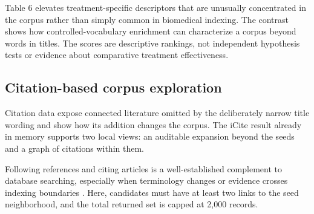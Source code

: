 \begin{table}
\centering
\caption{\label{tab:mesh-keyness-table}MeSH descriptors ranked highest by standardized log odds against the PubMed-wide baseline.}
\centering
{}
\end{table}

Table 6 elevates treatment-specific descriptors that are unusually concentrated
in the corpus rather than simply common in biomedical indexing. The contrast
shows how controlled-vocabulary enrichment can characterize a corpus beyond
words in titles. The scores are descriptive rankings, not independent
hypothesis tests or evidence about comparative treatment effectiveness.

\subsection{Citation-based corpus exploration}\label{citation-based-corpus-exploration}

Citation data expose connected literature omitted by the deliberately narrow
title wording and show how its addition changes the corpus. The iCite result
already in memory supports two local views: an auditable expansion beyond the
seeds and a graph of citations within them.

Following references and citing articles is a well-established complement to
database searching, especially when terminology changes or evidence crosses
indexing boundaries \citep{greenhalgh2005snowballing}. Here, candidates must have at
least two links to the seed neighborhood, and the total returned set is capped
at 2,000 records.

